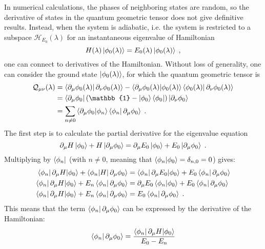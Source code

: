 \documentclass[../main.tex]{subfiles}
\begin{document}
In numerical calculations, the phases of neighboring states are random, so the derivative of states in the quantum geometric tensor does not give definitive results.
Instead, when the system is adiabatic, i.e. the system is restricted to a subspace \(\mathcal{H}_{E_0} (\lambda)\) for an instantaneous eigenvalue of Hamiltonian
\begin{equation}
	H (\lambda) \ket{\phi_0 (\lambda)} = E_0 (\lambda) \ket{\phi_0 (\lambda)} \;,
\end{equation}
one can connect to derivatives of the Hamiltonian.
Without loss of generality, one can consider the ground state \(\ket{\phi_0 (\lambda)}\), for which the quantum geometric tensor is
\begin{align}
	\mathcal{Q}_{\mu \nu} (\lambda) &= \braket{\pdif{\mu} \phi_0 (\lambda) | \pdif{\nu} \phi_0 (\lambda)} - \braket{\pdif{\mu} \phi_0 (\lambda) | \phi_0 (\lambda)} \braket{\phi_0 (\lambda) | \pdif{\nu} \phi_0 (\lambda)} \\
	&= \bra{\pdif{\mu} \phi_0} (\mathbb{1} - \ket{\phi_0} \bra{\phi_0}) \ket{\pdif{\nu} \phi_0} \\
	&= \sum_{n \neq 0} \braket{\pdif{\mu} \phi_0 | \phi_n} \braket{\phi_n | \pdif{\mu} \phi_0} \;.
\end{align}
The first step is to calculate the partial derivative for the eigenvalue equation
\begin{equation}
	\pdif{\mu} H \ket{\phi_0} + H \ket{\pdif{\mu} \phi_0} = \pdif{\mu} E_0 \ket{\phi_0} + E_0 \ket{\pdif{\mu} \phi_0} \;.
\end{equation}
Multiplying by \(\bra{\phi_n}\) (with \(n \neq 0\), meaning that \(\braket{\phi_n | \phi_0} = \delta_{n, 0} = 0\)) gives:
\begin{align}
	\braket{\phi_n | \pdif{\mu} H | \phi_0} + \braket{\phi_n | H | \pdif{\mu} \phi_0} &= \braket{\phi_n | \pdif{\mu} E_0 | \phi_0} + E_0 \braket{\phi_n | \pdif{\mu} \phi_0} \\
	\braket{\phi_n | \pdif{\mu} H | \phi_0} + E_n \braket{\phi_n | \pdif{\mu} \phi_0} &= \pdif{\mu} E_0 \braket{\phi_n | \phi_0} + E_0 \braket{\phi_n | \pdif{\mu} \phi_0} \\
	\braket{\phi_n | \pdif{\mu} H | \phi_0} + E_n \braket{\phi_n | \pdif{\mu} \phi_0} &= E_0 \braket{\phi_n | \pdif{\mu} \phi_0} \;.
\end{align}
This means that the term \(\braket{\phi_n | \pdif{\mu} \phi_0}\) can be expressed by the derivative of the Hamiltonian:
\begin{align}
	\braket{\phi_n | \pdif{\mu} \phi_0} = \frac{\braket{\phi_n | \pdif{\mu} H | \phi_0}}{E_0 - E_n}
\end{align}
\end{document}
